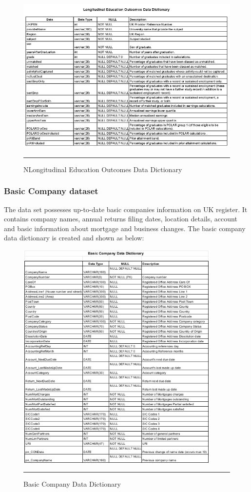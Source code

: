 \begin{figure}[H]
	\centering
	\includegraphics[width=1.0\textwidth]{Data-Dictionary/LEO.png}
	\rule{35em}{0.7pt}
	\caption[Longitudinal Education Outcomes Data Dictionary]{NLongitudinal Education Outcomes Data Dictionary}
\end{figure}

\pagebreak
\subsubsection{Basic Company dataset}

The data set possesses up-to-date basic companies information on UK register. It contains company names, annual returns filing dates, location details, account and basic information about mortgage and business changes. The basic company data dictionary is created and shown as below:

\begin{figure}[H]
	\centering	
	\includegraphics[width=0.9\textwidth]{Data-Dictionary/company-data-dictionary.png}
	\rule{35em}{0.5pt}
	\caption[Basic Company Data Dictionary]{Basic Company Data Dictionary}
\end{figure}

